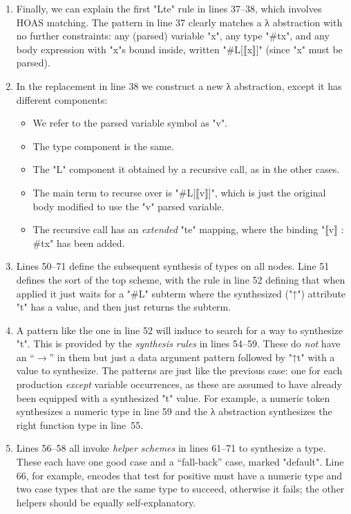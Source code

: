 \documentclass[letterpaper]{llncs}
\begin{document}
\begin{example}[analysis]
\begin{enumerate}
  \item Finally, we can explain the first "Lte" rule in lines 37--38, which involves HOAS
    matching. The pattern in line 37 clearly matches a λ abstraction with no further constraints:
    any (parsed) variable "x", any type "#tx", and any body expression with "x"s bound inside,
    written "#L[⟦x⟧]" (since "x" must be parsed).

  \item In the replacement in line 38 we construct a new λ abstraction, except it has different
    components:
    \begin{itemize}
    \item We refer to the parsed variable symbol as "v".
    \item The type component is the same.
    \item The "L" component it obtained by a recursive call, as in the other cases.
    \item The main term to recurse over is "#L[⟦v⟧]", which is just the original body modified to
      use the "v" parsed variable.
    \item The recursive call has an \emph{extended} "te" mapping, where the binding "⟦v⟧ : #tx" has
      been added.
    \end{itemize}

  \item Lines 50--71 define the subsequent synthesis of types on all nodes. Line 51 defines the sort
    of the top scheme, with the rule in line 52 defining that when applied it just waits for a "#L"
    subterm where the synthesized ("↑") attribute "t" has a value, and then just returns the
    subterm.

  \item A pattern like the one in line 52 will induce \HAX to search for a way to synthesize
    "t". This is provided by the \emph{synthesis rules} in lines 54--59. These do \emph{not} have an
    ``$→$'' in them but just a data argument pattern followed by "↑t" with a value to
    synthesize. The patterns are just like the previous case: one for each production \emph{except}
    variable occurrences, as these are assumed to have already been equipped with a synthesized "t"
    value.  For example, a numeric token synthesizes a numeric type in line 59 and the λ abstraction
    synthesizes the right function type in line~55.

  \item Lines 56--58 all invoke \emph{helper schemes} in lines 61--71 to synthesize a type. These
    each have one good case and a ``fall-back'' case, marked "default". Line 66, for example,
    encodes that test for positive must have a numeric type and two case types that are the same
    type to succeed, otherwise it fails; the other helpers should be equally self-explanatory.

  \end{enumerate}
\end{example}
\end{document}
